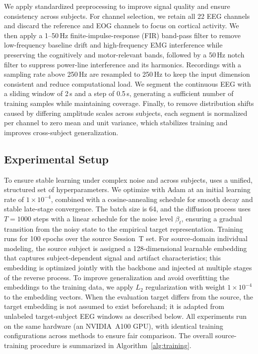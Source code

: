 We apply standardized preprocessing to improve signal quality and ensure
consistency across subjects. For channel selection, we retain all 22 EEG
channels and discard the reference and EOG channels to focus on cortical
activity. We then apply a 1--50\,Hz finite-impulse-response (FIR) band-pass
filter to remove low-frequency baseline drift and high-frequency EMG
interference while preserving the cognitively and motor-relevant bands, followed
by a 50\,Hz notch filter to suppress power-line interference and its harmonics.
Recordings with a sampling rate above 250\,Hz are resampled to 250\,Hz to keep
the input dimension consistent and reduce computational load. We segment the
continuous EEG with a sliding window of 2\,s and a step of 0.5\,s, generating a
sufficient number of training samples while maintaining coverage. Finally, to
remove distribution shifts caused by differing amplitude scales across subjects,
each segment is normalized per channel to zero mean and unit variance, which
stabilizes training and improves cross-subject generalization.

\subsection{Experimental Setup}
\label{sec:exp_setup}

To ensure stable learning under complex noise and across subjects, \saddpm{}
uses a unified, structured set of hyperparameters. We optimize with Adam at an
initial learning rate of $1\times10^{-4}$, combined with a cosine-annealing
schedule for smooth decay and stable late-stage convergence. The batch size is
64, and the diffusion process uses $T=1000$ steps with a linear schedule for the
noise level $\beta_t$, ensuring a gradual transition from the noisy state to the
empirical target representation. Training runs for 100 epochs over the source
Session~T set. For source-domain individual modeling, the source subject is
assigned a 128-dimensional learnable embedding that captures subject-dependent
signal and artifact characteristics; this embedding is optimized jointly with
the backbone and injected at multiple stages of the reverse process. To improve
generalization and avoid overfitting the embeddings to the training data, we
apply $L_2$ regularization with weight $1\times10^{-4}$ to the embedding
vectors. When the evaluation target differs from the source, the target
embedding is not assumed to exist beforehand; it is adapted from unlabeled
target-subject EEG windows as described below. All experiments run on the same
hardware (an NVIDIA~A100 GPU), with identical training configurations across
methods to ensure fair comparison. The overall source-training procedure is
summarized in Algorithm~\ref{alg:training}.

